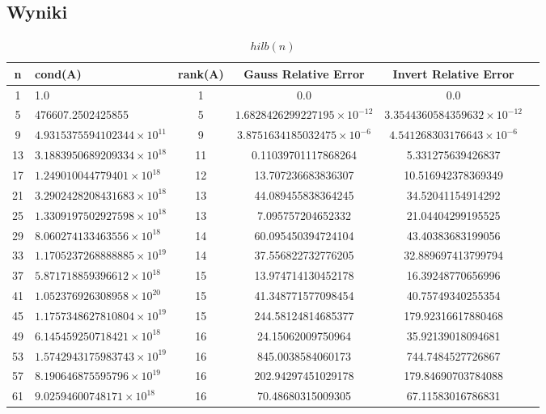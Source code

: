 \documentclass[10pt,a4paper, polish]{article}
\begin{document}
\subsection*{Wyniki}
\begin{table}[H]
\centering
\caption{$hilb(n)$}
\begin{tabular}{|c|p{3cm}|c|c|c|c|}
\hline
\textbf{n} & \textbf{cond(A)} & \textbf{rank(A)} & \textbf{Gauss Relative Error} & \textbf{Invert Relative Error} \\
\hline
\hline
1 & 1.0 & 1 & 0.0 & 0.0 \\
\hline
5 & 476607.2502425855 & 5 & $1.6828426299227195\times10^{-12}$ & $3.3544360584359632\times10^{-12}$ \\
\hline
9 & $4.9315375594102344\times10^{11}$ & 9 & $3.8751634185032475\times10^{-6}$ & $4.541268303176643\times10^{-6}$ \\
\hline
13 & $3.1883950689209334\times10^{18}$ & 11 & 0.11039701117868264 & 5.331275639426837 \\
\hline
17 & $1.249010044779401\times10^{18}$ & 12 & 13.707236683836307 & 10.516942378369349 \\
\hline
21 & $3.2902428208431683\times10^{18}$ & 13 & 44.089455838364245 & 34.52041154914292 \\
\hline
25 & $1.3309197502927598\times10^{18}$ & 13 & 7.095757204652332 & 21.04404299195525 \\
\hline
29 & $8.060274133463556\times10^{18}$ & 14 & 60.095450394724104 & 43.40383683199056 \\
\hline
33 & $1.1705237268888885\times10^{19}$ & 14 & 37.556822732776205 & 32.889697413799794 \\
\hline
37 & $5.871718859396612\times10^{18}$ & 15 & 13.974714130452178 & 16.39248770656996 \\
\hline
41 & $1.052376926308958\times10^{20}$ & 15 & 41.348771577098454 & 40.75749340255354 \\
\hline
45 & $1.1757348627810804\times10^{19}$ & 15 & 244.58124814685377 & 179.92316617880468 \\
\hline
49 & $6.145459250718421\times10^{18}$ & 16 & 24.15062009750964 & 35.92139018094681 \\
\hline
53 & $1.5742943175983743\times10^{19}$ & 16 & 845.0038584060173 & 744.7484527726867 \\
\hline
57 & $8.190646875595796\times10^{19}$ & 16 & 202.94297451029178 & 179.84690703784088 \\
\hline
61 & $9.02594600748171\times10^{18}$ & 16 & 70.48680315009305 & 67.11583016786831 \\
\hline
\end{tabular}
\end{table}
\end{document}
